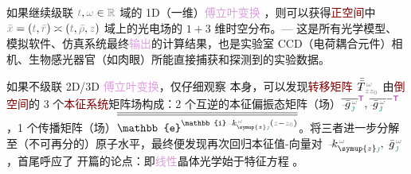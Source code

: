 如果继续级联 $\mathcolor{gray}{t}, \mathcolor{gray}{\omega} \in \mathcolor{gray}{\mathbb{R}}$ 域的 1D（一维）\textcolor{Plum}{傅立叶变换} ，则可以获得\textcolor{Maroon}{正空间}中 $\mathcolor{gray}{\bar{x}} = \left( \mathcolor{gray}{t}, \mathcolor{gray}{\bar{r}} \right) \asymp \left( \mathcolor{gray}{t}, \mathcolor{gray}{\bar{\rho}}, \mathcolor{gray}{z} \right)$ 域上的光电场的 $1+3$ 维时空分布。--- 这是所有光学模型、模拟软件、仿真系统最终\textcolor{Plum}{输出}的计算结果，也是实验室 CCD（电荷耦合元件）相机、生物感光器官（如肉眼）所能直接捕获和探测到的实验数据。

如果不级联 2D/3D \textcolor{Plum}{傅立叶变换}，仅仔细观察  本身，可以发现\textcolor{Maroon}{转移矩阵} $\Xint{\mathcolor{gray}{-}}{30}{\bar{\bar{T}}}^{\;\!\mathcolor{gray}{\omega}}_{\;\! \mathcolor{gray}{z} \mathcolor{gray}{z_0}}$ 由\textcolor{Maroon}{倒空间}的 3 个\textcolor{Maroon}{本征系统}矩阵场构成：2 个互逆的\textcolor{PineGreen}{本征偏振态矩阵}（场）$\overline{\Xint{{}^{}_{\mathcolor{gray}{-}}}{10}{\bar{g}}^{\;\!\mathcolor{gray}{\omega}}_{\;\! \textcolor{PineGreen}{\jmath}}}^{\mathsf{\textcolor{Plum}{T}}}, \overline{\Xint{{}^{}_{\mathcolor{gray}{-}}}{10}{\bar{g}}^{\;\!\mathcolor{gray}{\omega}}_{\;\! \textcolor{PineGreen}{\jmath}}}^{-\mathsf{\textcolor{Plum}{T}}}$，1 个\textcolor{PineGreen}{传播矩阵}（场）$\overline{\overline{\mathbb{e}^{\mathbb{i} \Xint{\begin{smallmatrix} ~ \\ {}^{}_{\mathcolor{gray}{-}} \\ ~ \end{smallmatrix}}{15}{k}_{\symup{z} \textcolor{PineGreen}{\jmath}}^{\;\! \mathcolor{gray}{\omega}} \left( \mathcolor{gray}{z} - \mathcolor{gray}{z_0} \right)}}}$。将三者进一步分解至（不可再分的）原子水平，最终便发现再次回归\textcolor{PineGreen}{本征值}-\textcolor{PineGreen}{向量}对 $\Xint{\begin{smallmatrix} ~ \\ {}^{}_{\mathcolor{gray}{-}} \\ ~ \end{smallmatrix}}{15}{k}_{\symup{z} \textcolor{PineGreen}{\jmath}}^{\;\! \mathcolor{gray}{\omega}}, \Xint{{}^{}_{\mathcolor{gray}{-}}}{10}{\bar{g}}^{\;\!\mathcolor{gray}{\omega}}_{\;\! \textcolor{PineGreen}{\jmath}}$，首尾呼应了  开篇的论点：即\textcolor{Plum}{线性}\textcolor{PineGreen}{晶体光学}始于\textcolor{PineGreen}{特征方程} 。

